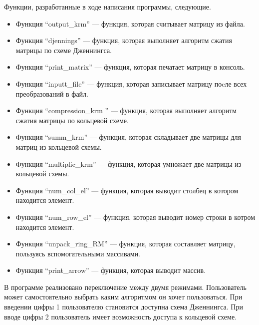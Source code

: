 \documentclass[12pt, a4paper]{article}
\begin{document}
Функции, разработанные в ходе написания программы, следующие.
\begin{itemize}
    \item[---] Функция ``output\_krm'' --- функция, которая считывает матрицу из файла.
    \item[---] Функция ``djennings'' --- функция, которая выполняет алгоритм сжатия матрицы по схеме Дженнингса.
    \item[---] Функция ``print\_matrix'' --- функция, которая печатает матрицу в консоль.
    \item[---] Функция ``inputt\_file'' --- функция, которая записывает матрицу поcле всех преобразований в файл.
    \item[---] Функция ``compression\_krm '' --- функция, которая выполняет алгоритм сжатия матрицы по кольцевой схеме.
    \item[---] Функция ``summ\_krm'' --- функция, которая складывает две матрицы для матриц из кольцевой схемы.
    \item[---] Функция ``multiplic\_krm'' --- функция, которая умножает две матрицы из кольцевой схемы.
    \item[---] Функция ``num\_col\_el'' --- функция, которая выводит столбец в котором находится элемент.
    \item[---] Функция ``num\_row\_el'' --- функция, которая выводит номер строки в котром находится элемент.
    \item[---] Функция ``unpack\_ring\_RM'' --- функция, которая составляет матрицу, пользуясь вспомогательными массивами. 
    \item[---] Функция ``print\_arrow'' --- функция, которая выводит массив.
\end{itemize}

В программе реализовано переключение между двумя режимами. Пользователь может самостоятельно выбрать каким алгоритмом он хочет пользоваться. При введении цифры 1 пользователю становится доступна схема Дженнингса. При вводе цифры 2 пользователь имеет возможность доступа к кольцевой схеме.
\end{document}

